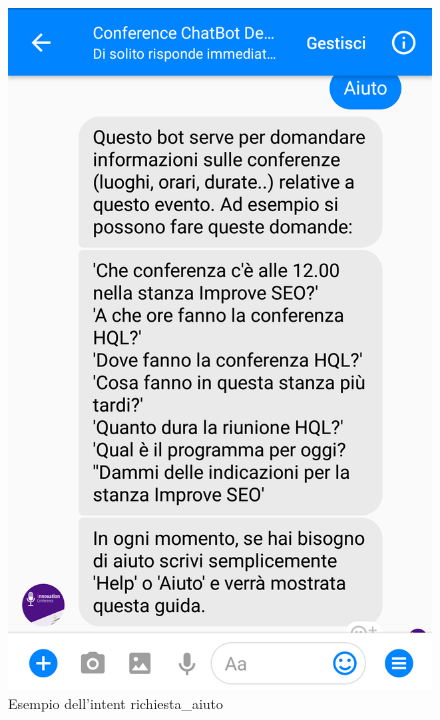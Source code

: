 \begin{itemize}
\begin{figure}[h!]
		\includegraphics[scale=0.16]{../Immagini/aiuto.png}
		\caption{Esempio dell'intent richiesta\_aiuto}
	\end{figure}	
\end{itemize}
\newpage
